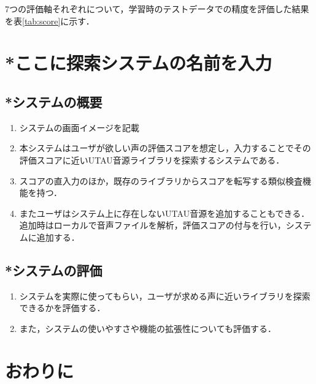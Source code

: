 \documentclass[a4j,8pt,twocolumn]{extarticle}
\begin{document}
7つの評価軸それぞれについて，学習時のテストデータでの精度を評価した結果を表\ref{tab:score}に示す．

\section{*ここに探索システムの名前を入力}
\subsection{*システムの概要}
\begin{enumerate}
  \item システムの画面イメージを記載
  \item 本システムはユーザが欲しい声の評価スコアを想定し，入力することでその評価スコアに近いUTAU音源ライブラリを探索するシステムである．
  \item スコアの直入力のほか，既存のライブラリからスコアを転写する類似検査機能を持つ．
  \item またユーザはシステム上に存在しないUTAU音源を追加することもできる．追加時はローカルで音声ファイルを解析，評価スコアの付与を行い，システムに追加する．
\end{enumerate}

\subsection{*システムの評価}
\begin{enumerate}
  \item システムを実際に使ってもらい，ユーザが求める声に近いライブラリを探索できるかを評価する．
  \item また，システムの使いやすさや機能の拡張性についても評価する．
\end{enumerate}

\section{おわりに}
\end{document}

